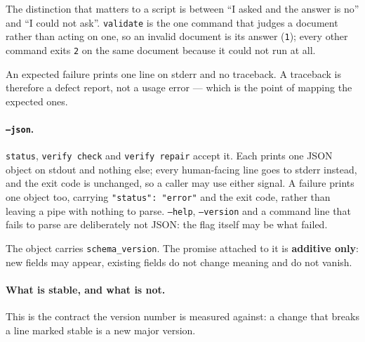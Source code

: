 The distinction that matters to a script is between ``I asked and the answer
is no'' and ``I could not ask''. \texttt{validate} is the one command that
judges a document rather than acting on one, so an invalid document is its
answer (\texttt{1}); every other command exits \texttt{2} on the same
document because it could not run at all.

An expected failure prints one line on stderr and no traceback. A traceback
is therefore a defect report, not a usage error --- which is the point of
mapping the expected ones.

\paragraph{\texttt{--json}.} \texttt{status}, \texttt{verify check} and
\texttt{verify repair} accept it. Each prints one JSON object on stdout and nothing else; every
human-facing line goes to stderr instead, and the exit code is unchanged, so
a caller may use either signal. A failure prints one object too, carrying
\texttt{"status": "error"} and the exit code, rather than leaving a pipe
with nothing to parse. \texttt{--help}, \texttt{--version} and a command
line that fails to parse are deliberately not JSON: the flag itself may be
what failed.

The object carries \texttt{schema\_version}. The promise attached to it is
\textbf{additive only}: new fields may appear, existing fields do not change
meaning and do not vanish.

\paragraph{What is stable, and what is not.} This is the contract the
version number is measured against: a change that breaks a line marked
stable is a new major version.


